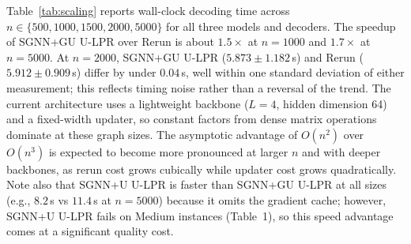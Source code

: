 \documentclass[mathematics,article,submit,pdftex,moreauthors]{Definitions/mdpi}
\begin{document}
Table~\ref{tab:scaling} reports wall-clock decoding time across
$n\in\{500,1000,1500,2000,5000\}$ for all three models and decoders. The speedup
of \textsc{SGNN+GU} U-LPR over Rerun is about $1.5\times$ at $n=1000$ and
$1.7\times$ at $n=5000$. At $n=2000$, \textsc{SGNN+GU} U-LPR ($5.873\pm1.182$\,s)
and Rerun ($5.912\pm0.909$\,s) differ by under $0.04$\,s, well within one standard
deviation of either measurement; this reflects timing noise rather than a reversal
of the trend. The current architecture uses a lightweight backbone ($L=4$, hidden
dimension 64) and a fixed-width updater, so constant factors from dense matrix
operations dominate at these graph sizes. The asymptotic advantage of $O(n^2)$ over
$O(n^3)$ is expected to become more pronounced at larger $n$ and with deeper
backbones, as rerun cost grows cubically while updater cost grows quadratically.
Note also that \textsc{SGNN+U} U-LPR is faster than \textsc{SGNN+GU} U-LPR at
all sizes (e.g., $8.2$\,s vs $11.4$\,s at $n=5000$) because it omits the gradient
cache; however, \textsc{SGNN+U} U-LPR fails on Medium instances (Table~1), so this
speed advantage comes at a significant quality cost.
\end{document}
